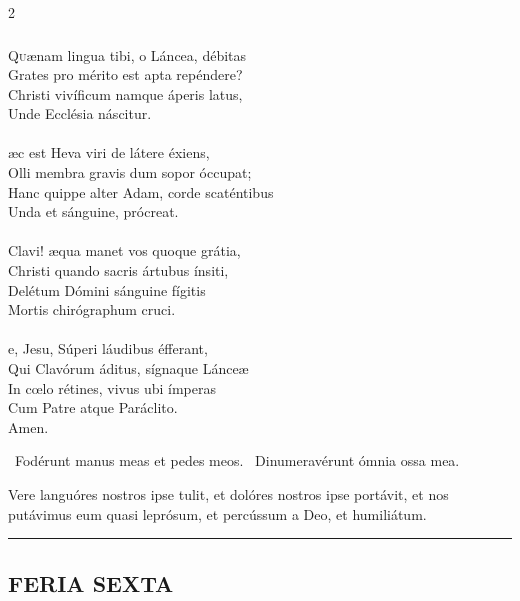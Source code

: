 \documentclass[9pt,twoside]{extarticle}
\begin{document}
\begin{multicols}{2}
\subsubsection*{\center {}}
\lettrine{Q}uænam lingua tibi, o Láncea, débitas\\
Grates pro mérito est apta repéndere?\\
Christi vivíficum namque áperis latus,\\
Unde Ecclésia náscitur.\\
\\
æc est Heva viri de látere éxiens,\\
Olli membra gravis dum sopor óccupat;\\
Hanc quippe alter Adam, corde scaténtibus\\
Unda et sánguine, prócreat.\\
\\
 Clavi! æqua manet vos quoque grátia,\\
Christi quando sacris ártubus ínsiti,\\
Delétum Dómini sánguine fígitis\\
Mortis chirógraphum cruci.\\
\\
e, Jesu, Súperi láudibus éfferant,\\
Qui Clavórum áditus, sígnaque Lánceæ\\
In cœlo rétines, vivus ubi ímperas\\
Cum Patre atque Paráclito.\\
Amen.

\begin{tightlist}{}
\item {}~Fodérunt manus meas et pedes meos. ~Dinumeravérunt ómnia ossa mea.
\item {} Vere languóres nostros ipse tulit, et dolóres nostros ipse portávit, et nos putávimus eum quasi leprósum, et percússum a Deo, et humiliátum.
\end{tightlist}

\begin{center}\textcolor{red}{\rule{\linewidth}{0.5pt}} \end{center}

\subsection*{\center \textsc{FERIA SEXTA}\\
}

\end{multicols}
\end{document}
